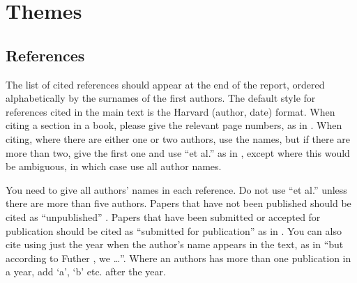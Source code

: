\documentclass[12pt,a4paper]{article}
\begin{document}
\newpage

\section{Themes}

\subsection{References}

The list of cited references should appear at the end of the report, ordered alphabetically by the surnames of the first authors.  The default style for references cited in the main text is the  Harvard (author, date) format.  When citing a section in a book, please give the relevant page numbers, as in \cite[p293]{budgen}.  When citing, where there are either one or two authors, use the names, but if there are more than two, give the first one and use ``et al.'' as in  , except where this would be ambiguous, in which case use all author names.

You need to give all authors' names in each reference.  Do not use ``et al.'' unless there are more than five authors.  Papers that have not been published should be cited as ``unpublished'' \cite{euther}.  Papers that have been submitted or accepted for publication should be cited as ``submitted for publication'' as in \cite{futher} .  You can also cite using just the year when the author's name appears in the text, as in ``but according to Futher \citeyear{futher}, we \dots''.  Where an authors has more than one publication in a year, add `a', `b' etc. after the year.





\end{document}
